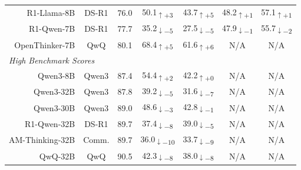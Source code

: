 \documentclass{article} %
\begin{document}
\begin{table}[t]
\begin{tabular}{r|c|c|cc|cc}
    R1-Llama-8B       & DS-R1 & 76.0 &
    \cellcolor{green!13}50.1\textsubscript{$\uparrow+3$} &
    \cellcolor{green!15}43.7\textsubscript{$\uparrow+5$} &
    \cellcolor{green!11}48.2\textsubscript{$\uparrow+1$} &
    \cellcolor{green!11}57.1\textsubscript{$\uparrow+1$} \\

    R1-Qwen-7B        & DS-R1 & 77.7 &
    \cellcolor{red!15}35.2\textsubscript{$\downarrow-5$} &
    \cellcolor{red!15}27.5\textsubscript{$\downarrow-5$} &
    \cellcolor{red!11}47.9\textsubscript{$\downarrow-1$} &
    \cellcolor{red!12}55.7\textsubscript{$\downarrow-2$} \\

    OpenThinker-7B    & QwQ   & 80.1 &
    \cellcolor{green!15}68.4\textsubscript{$\uparrow+5$} &
    \cellcolor{green!16}61.6\textsubscript{$\uparrow+6$} &
    N/A & N/A \\

    \midrule
    \multicolumn{7}{l}{\textit{High Benchmark Scores}} \\
    \midrule

    Qwen3-8B          & Qwen3 & 87.4 &
    \cellcolor{green!12}54.4\textsubscript{$\uparrow+2$} &
    \cellcolor{green!0}42.2\textsubscript{$\uparrow+0$} &
    N/A & N/A \\

    Qwen3-32B         & Qwen3 & 87.8 &
    \cellcolor{red!15}39.2\textsubscript{$\downarrow-5$} &
    \cellcolor{red!27}31.6\textsubscript{$\downarrow-7$} &
    N/A & N/A \\

    Qwen3-30B         & Qwen3 & 89.0 &
    \cellcolor{red!13}48.6\textsubscript{$\downarrow-3$} &
    \cellcolor{red!11}42.8\textsubscript{$\downarrow-1$} &
    N/A & N/A \\

    R1-Qwen-32B       & DS-R1 & 89.7 &
    \cellcolor{red!28}37.4\textsubscript{$\downarrow-8$} &
    \cellcolor{red!15}39.0\textsubscript{$\downarrow-5$} &
    N/A & N/A \\

    AM-Thinking-32B   & Comm. & 89.7 &
    \cellcolor{red!33}36.0\textsubscript{$\downarrow-10$} &
    \cellcolor{red!29}33.7\textsubscript{$\downarrow-9$} &
    N/A & N/A \\

    QwQ-32B           & QwQ   & 90.5 &
    \cellcolor{red!28}42.3\textsubscript{$\downarrow-8$} &
    \cellcolor{red!28}38.0\textsubscript{$\downarrow-8$} &
    N/A & N/A \\


\end{tabular}
\end{table}
\end{document}

